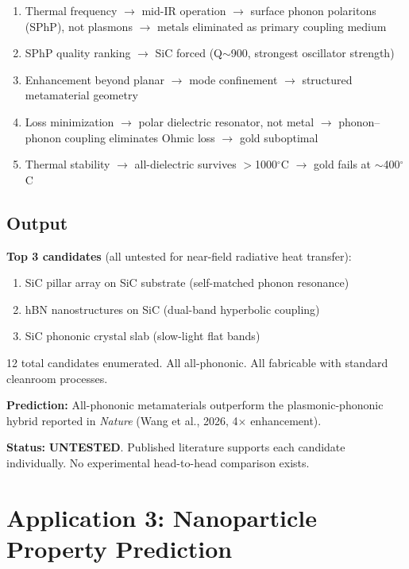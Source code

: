 \documentclass[11pt, a4paper]{article}
\newcommand{\untested}{\textcolor{nm-orange}{\textbf{UNTESTED}}}
\begin{document}
\begin{enumerate}
  \item Thermal frequency $\to$ mid-IR operation $\to$
    surface phonon polaritons (SPhP), not plasmons $\to$
    metals eliminated as primary coupling medium
  \item SPhP quality ranking $\to$ SiC forced (Q$\sim$900,
    strongest oscillator strength)
  \item Enhancement beyond planar $\to$ mode confinement
    $\to$ structured metamaterial geometry
  \item Loss minimization $\to$ polar dielectric resonator,
    not metal $\to$ phonon--phonon coupling eliminates Ohmic
    loss $\to$ gold suboptimal
  \item Thermal stability $\to$ all-dielectric survives
    $>$1000$^\circ$C $\to$ gold fails at $\sim$400$^\circ$C
\end{enumerate}

\subsection{Output}

\textbf{Top 3 candidates} (all untested for near-field
radiative heat transfer):
\begin{enumerate}[nosep]
  \item SiC pillar array on SiC substrate (self-matched
    phonon resonance)
  \item hBN nanostructures on SiC (dual-band hyperbolic
    coupling)
  \item SiC phononic crystal slab (slow-light flat bands)
\end{enumerate}

12 total candidates enumerated. All all-phononic.
All fabricable with standard cleanroom processes.

\textbf{Prediction:} All-phononic metamaterials outperform
the plasmonic-phononic hybrid reported in \textit{Nature}
(Wang et al., 2026, 4$\times$ enhancement).

\textbf{Status:} \untested. Published literature supports
each candidate individually. No experimental head-to-head
comparison exists.

\section{Application 3: Nanoparticle Property Prediction}
\end{document}

